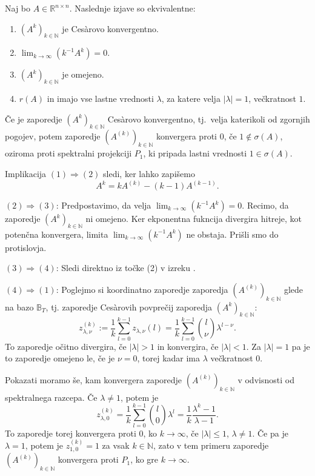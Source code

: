 \documentclass[mat1]{fmfdelo}
\newcommand{\R}{\mathbb R}
\newcommand{\N}{\mathbb N}
\begin{document}
\begin{izrek}\label{izrekCesaro}
    Naj bo $A \in \R^{n \times n}$. Naslednje izjave so ekvivalentne:
    \begin{enumerate}
        \item $(A^k)_{k\in\N}$ je Ces\`arovo konvergentno.
        \item $\lim_{k\rightarrow \infty} (k^{-1}A^k) = 0$.
        \item $(A^k)_{k\in\N}$ je omejeno.
        \item $r(A)$ in imajo vse lastne vrednosti $\lambda$, za katere velja $|\lambda| = 1$, večkratnost $1$.
    \end{enumerate}
    Če je zaporedje $(A^k)_{k\in\N}$ Ces\`arovo konvergentno, tj.\ velja katerikoli od zgornjih pogojev, potem zaporedje $(A^{(k)})_{k\in\N}$ konvergera proti $0$, če $1 \notin \sigma(A)$, oziroma proti spektralni projekciji $P_1$, ki pripada lastni vrednosti $1\in\sigma(A)$.
\end{izrek}
\begin{dokaz}
    Implikacija $(1) \Rightarrow (2)$ sledi, ker lahko zapišemo
    \begin{equation*}
        A^k = k A^{(k)} - (k-1) A^{(k-1)}.
    \end{equation*}

    \noindent $(2) \Rightarrow (3)$: Predpostavimo, da velja $\lim_{k\rightarrow \infty} (k^{-1}A^k) = 0$. Recimo, da zaporedje $(A^k)_{k\in\N}$ ni omejeno. Ker ekponentna fukncija divergira hitreje, kot potenčna konvergera, limita $\lim_{k\rightarrow \infty} (k^{-1}A^k)$ ne obstaja. Prišli smo do protislovja.
    
    \noindent $(3) \Rightarrow (4)$: Sledi direktno iz točke (2) v izreku .
    
    \noindent $(4) \Rightarrow (1)$: Poglejmo si koordinatno zaporedje zaporedja $(A^{(k)})_{k\in\N}$ glede na bazo $\mathbb{B}_T$, tj. zaporedje Ces\`arovih povprečij zaporedja $(A^k)_{k\in\N}$:
    \begin{equation*}
        z_{\lambda, \nu}^{(k)} := \frac{1}{k} \sum_{l=0}^{k-1} z_{\lambda, \nu} (l) = \frac{1}{k} \sum_{l=0}^{k-1}{l \choose \nu} \lambda^{l - \nu}.
    \end{equation*}
    To zaporedje očitno divergira, če $|\lambda| > 1$ in konvergira, če $|\lambda| < 1$. Za $|\lambda| = 1$ pa je to zaporedje omejeno le, če je $\nu = 0$, torej kadar ima $\lambda$ večkratnost $0$.

    \noindent Pokazati moramo še, kam konvergera zaporedje $(A^{(k)})_{k\in\N}$ v odvisnosti od spektralnega razcepa. Če $\lambda \neq 1$, potem je
    \begin{equation*}
        z_{\lambda, 0}^{(k)} = \frac{1}{k} \sum_{l=0}^{k-1}{l \choose 0} \lambda^{l} = \frac{1}{k}\frac{\lambda^k-1}{\lambda-1}.
    \end{equation*}
    To zaporedje torej konvergera proti $0$, ko $k\rightarrow\infty$, če $|\lambda|\leq 1$, $\lambda \neq 1$. Če pa je $\lambda = 1$, potem je $z_{1, 0}^{(k)} = 1$ za vsak $k \in \N$, zato v tem primeru zaporedje $(A^{(k)})_{k\in\N}$ konvergera proti $P_1$, ko gre $k\rightarrow\infty$.

\end{dokaz}
\end{document}
